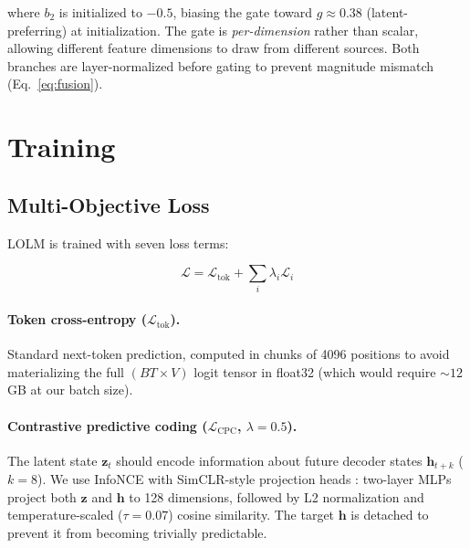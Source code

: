 \documentclass{article}
\begin{document}
where $b_2$ is initialized to $-0.5$, biasing the gate toward $g \approx 0.38$
(latent-preferring) at initialization. The gate is \emph{per-dimension} rather
than scalar, allowing different feature dimensions to draw from different
sources. Both branches are layer-normalized before gating to prevent magnitude
mismatch (Eq.~\ref{eq:fusion}).

\section{Training}
\label{sec:training}

\subsection{Multi-Objective Loss}
\label{sec:losses}

LOLM is trained with seven loss terms:

\begin{equation}
\mathcal{L} = \mathcal{L}_\text{tok} + \sum_{i} \lambda_i \mathcal{L}_i
\end{equation}

\paragraph{Token cross-entropy ($\mathcal{L}_\text{tok}$).}
Standard next-token prediction, computed in chunks of 4096 positions to avoid
materializing the full $(BT \times V)$ logit tensor in float32 (which would
require ${\sim}12$\,GB at our batch size).

\paragraph{Contrastive predictive coding ($\mathcal{L}_\text{CPC}$, $\lambda{=}0.5$).}
The latent state $\mathbf{z}_t$ should encode information about future decoder
states $\mathbf{h}_{t+k}$ ($k{=}8$). We use InfoNCE
\citep{oord2018representation} with SimCLR-style projection heads
\citep{chen2020simple}: two-layer MLPs project both $\mathbf{z}$ and
$\mathbf{h}$ to 128 dimensions, followed by L2 normalization and
temperature-scaled ($\tau{=}0.07$) cosine similarity. The target $\mathbf{h}$
is detached to prevent it from becoming trivially predictable.
\end{document}
